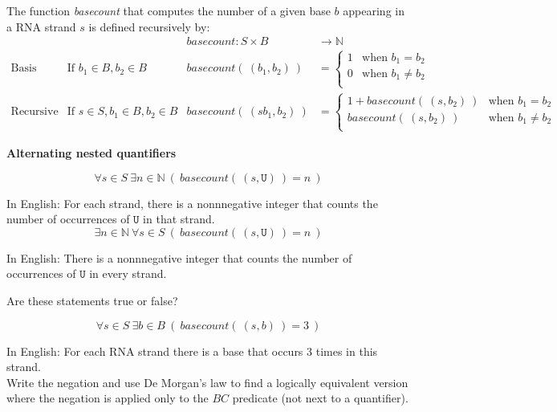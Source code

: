 \documentclass[12pt, oneside]{article}
\newcommand{\U}[0]{\texttt{U}}
\begin{document}
The function \textit{basecount} that computes the number of a given base 
$b$ appearing in a RNA strand $s$ is defined recursively by:
\[
\begin{array}{llll}
& & \textit{basecount} : S \times B & \to \mathbb{N} \\
\textrm{Basis Step:} &  \textrm{If } b_1 \in B, b_2 \in B & \textit{basecount}(~(b_1, b_2)~) & =
        \begin{cases}
            1 & \textrm{when } b_1 = b_2 \\
            0 & \textrm{when } b_1 \neq b_2 \\
        \end{cases} \\
\textrm{Recursive Step:} & \textrm{If } s \in S, b_1 \in B, b_2 \in B &\textit{basecount}(~(s b_1, b_2)~) & =
        \begin{cases}
            1 + \textit{basecount}(~(s, b_2)~) & \textrm{when } b_1 = b_2 \\
            \textit{basecount}(~(s, b_2)~) & \textrm{when } b_1 \neq b_2 \\
        \end{cases}
\end{array}
\] 


{\bf Alternating nested quantifiers}



$$\forall s \in S ~\exists n \in \mathbb{N} ~(~basecount(~(s,\U)~) = n~)$$

In English: For each strand, there is a nonnnegative integer that counts the number of occurrences of $\U$ in that 
strand.\\

$$\exists n \in \mathbb{N} ~\forall s \in S ~(~basecount(~(s,\U)~) = n~)$$

In English: There is a nonnnegative integer that counts the number of occurrences of $\U$ in every 
strand.\\

\vfill

Are these statements true or false?

\newpage

$$\forall s \in S ~\exists b\in B ~(~basecount(~(s,b)~) = 3~)$$

In English: For each RNA strand there is a base that occurs 3 times in this strand.\\

Write the negation and use De Morgan's law to find a 
logically equivalent version where the negation is applied only to the 
$BC$ predicate (not next to a quantifier).
\end{document}
